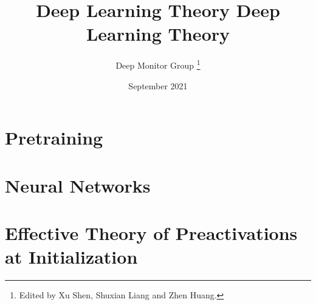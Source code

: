 \documentclass[12pt, letterpaper, twoside]{article}
\title{\textbf{Deep Learning Theory}}
\title{
    \textbf{Deep Learning Theory}
}
\author{Deep Monitor Group \thanks{Edited by Xu Shen, Shuxian Liang and Zhen Huang.}}
\date{September 2021}
\begin{document}
\begin{titlepage}
\maketitle
\end{titlepage}

\tableofcontents
\newpage

\section{Pretraining}


\section{Neural Networks}


\section{Effective Theory of Preactivations at Initialization}

\end{document}
